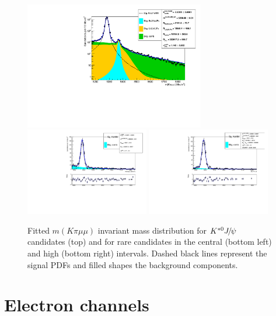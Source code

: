 \begin{figure}[h!]
\centering \includegraphics[width=0.7\textwidth]{RKst/figs/fit_MMs_0_MM-q2central-gmc/KstJPsMM_log.pdf} \\
\includegraphics[width=0.48\textwidth]{RKst/figs/fit_MMs_0_MM-q2central-gmc/KstMM_fitAndRes.pdf}
\includegraphics[width=0.48\textwidth]{RKst/figs/fit_MMs_0_MM-q2high-gmc/KstMM_fitAndRes.pdf}
\caption{Fitted $m(K\pi \mu\mu)$ invariant mass distribution for $\Kstarz\jpsi$ candidates (top)
and for rare candidates in the central (bottom left) and high (bottom right) \qsq intervals.
Dashed black lines represent the signal PDFs and filled shapes the background components. }
\label{fig:mumu_data_fits}
\end{figure}


\section{Electron channels}
\label{sec:RKst_fit_ee}

